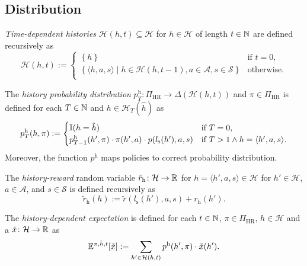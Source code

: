 \subsection{Distribution}

\begin{definition}\label{def:histories}
  \emph{Time-dependent histories} $\mathcal{H}(h,t) \subseteq \mathcal{H}$ for $h\in \mathcal{H}$ of length $t\in \mathbb{N}$ are defined recursively as
  \[
    \mathcal{H}(h,t) :=
    \begin{cases}
    \left\{  h \right\}  &\text{if } t = 0, \\
    \left\{  \langle h, a, s \rangle \mid h\in \mathcal{H}(h, t-1), a\in \mathcal{A}, s\in \mathcal{S}  \right\}  &\text{otherwise}. \\
    \end{cases}
  \]
\end{definition}

\begin{definition}\label{def:hist-dist}
The \emph{history probability distribution} $p^{\mathrm{h}}_T \colon  \Pi_{\mathrm{HR}} \to \Delta(\mathcal{H}(h,t))$  and $\pi \in \Pi_{\mathrm{HR}}$ is defined for each $T \in \mathbb{N}$ and $h\in \mathcal{H}_T(\hat{h})$ as
\[
p^{\mathrm{h}}_T(h, \pi) :=
\begin{cases}
\mathbb{I}(h = \hat{h}) &\text{if } T = 0, \\
p_{T-1}^{\mathrm{h}}(h', \pi) \cdot \pi(h',a) \cdot  p(l_{\mathrm{s}}(h'), a , s) &\text{if } T > 1 \wedge h = \langle h', a, s \rangle.
\end{cases}
\]
Moreover, the function $p^{\mathrm{h}}$ maps policies to correct probability distribution.
 \leanok
\end{definition}

\begin{definition} \label{def:reward}
The \emph{history-reward} random variable $\tilde{r}_{\mathrm{h}}\colon \mathcal{H} \to \mathbb{R}$ for $h = \langle h', a, s \rangle \in  \mathcal{H}$ for $h'\in \mathcal{H}$, $a\in \mathcal{A}$, and $s\in \mathcal{S}$ is defined recursively as
\[
\tilde{r}_{\mathrm{h}}(h) := \tilde{r}(l_{\mathrm{s}}(h'), a, s) + r_{\mathrm{h}}(h').
\]
 \leanok
\end{definition}

\begin{definition}\label{def:expect-h}
The \emph{history-dependent expectation} is defined for each $t\in \mathbb{N}$, $\pi\in \Pi_{\mathrm{HR}}$, $h\in \mathcal{H}$ and a $\tilde{x}\colon \mathcal{H} \to \mathbb{R}$ as
\[
\mathbb{E}^{\pi, \hat{h}, t} [\tilde{x}]
:= \sum_{h'\in \mathcal{H}(h, t)} p^{\mathrm{h}}(h', \pi) \cdot \tilde{x}(h').
\]
 \leanok
\end{definition}

